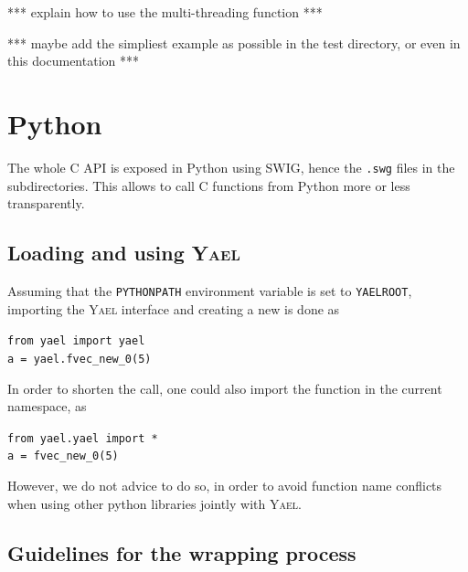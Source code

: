 \documentclass[a4paper,11pt,notitlepage,final,twoside]{report}
\newcommand{\yael}{\textsc{Yael}\xspace}
\newcommand{\yroot}{\texttt{YAELROOT}\xspace}
\newcommand{\tc}[1]{\texttt{#1}}
\newcommand{\code}[1]{\smallskip 

\texttt{#1} 
 \medskip

}
\begin{document}
*** explain how to use the multi-threading function ***

*** maybe add the simpliest example as possible in the test directory, 
or even in this documentation  *** 

\chapter{Python}

The whole C API is exposed in Python using SWIG, hence the \tc{.swg} files in the subdirectories. This allows to call C functions from Python more or less transparently. 


\section{Loading and using \yael}

Assuming that the \tc{PYTHONPATH} environment variable is set to \yroot, 
importing the \yael interface and creating a new is done as 
\code{from yael import yael  \\
a = yael.fvec\_new\_0(5)
}

In order to shorten the call, one could also import the function 
in the current namespace, as
\code{from yael.yael import * \\
a = fvec\_new\_0(5)
}

However, we do not advice to do so, in order to avoid function name conflicts 
when using other python libraries jointly with \yael. 

\section{Guidelines for the wrapping process}
\end{document}
